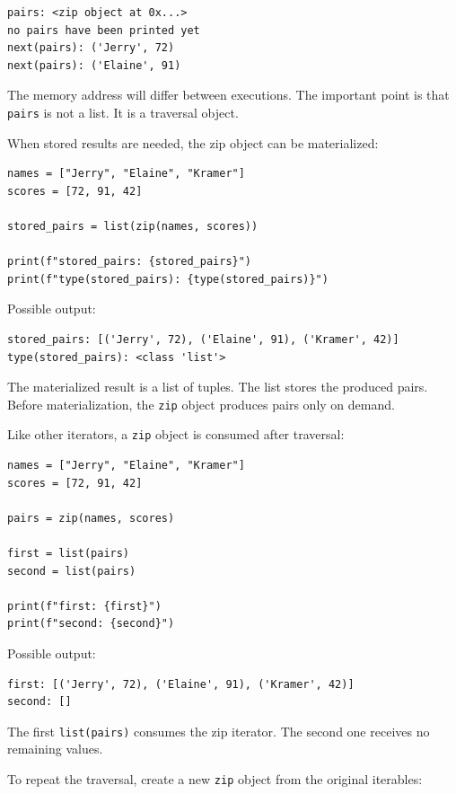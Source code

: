 \documentclass[a4paper,twoside]{report}
\begin{document}
\begin{verbatim}
pairs: <zip object at 0x...>
no pairs have been printed yet
next(pairs): ('Jerry', 72)
next(pairs): ('Elaine', 91)
\end{verbatim}

The memory address will differ between executions. The important point is that \texttt{pairs} is not a list. It is a traversal object.

When stored results are needed, the zip object can be materialized:

\begin{verbatim}
names = ["Jerry", "Elaine", "Kramer"]
scores = [72, 91, 42]

stored_pairs = list(zip(names, scores))

print(f"stored_pairs: {stored_pairs}")
print(f"type(stored_pairs): {type(stored_pairs)}")
\end{verbatim}

Possible output:

\begin{verbatim}
stored_pairs: [('Jerry', 72), ('Elaine', 91), ('Kramer', 42)]
type(stored_pairs): <class 'list'>
\end{verbatim}

The materialized result is a list of tuples. The list stores the produced pairs. Before materialization, the \texttt{zip} object produces pairs only on demand.

Like other iterators, a \texttt{zip} object is consumed after traversal:

\begin{verbatim}
names = ["Jerry", "Elaine", "Kramer"]
scores = [72, 91, 42]

pairs = zip(names, scores)

first = list(pairs)
second = list(pairs)

print(f"first: {first}")
print(f"second: {second}")
\end{verbatim}

Possible output:

\begin{verbatim}
first: [('Jerry', 72), ('Elaine', 91), ('Kramer', 42)]
second: []
\end{verbatim}

The first \texttt{list(pairs)} consumes the zip iterator. The second one receives no remaining values.

To repeat the traversal, create a new \texttt{zip} object from the original iterables:
\end{document}
